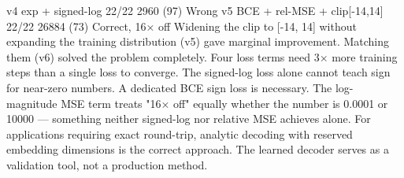 {}\markdownRendererPipe{} v4 \markdownRendererPipe{} exp + signed-log \markdownRendererPipe{} 22/22 \markdownRendererPipe{} 2960 (97\markdownRendererPercentSign{}) \markdownRendererPipe{} Wrong \markdownRendererPipe{}\markdownRendererSoftLineBreak
{}\markdownRendererPipe{} v5 \markdownRendererPipe{} BCE + rel-MSE + clip[-14,14] \markdownRendererPipe{} 22/22 \markdownRendererPipe{} 26884 (73\markdownRendererPercentSign{}) \markdownRendererPipe{} Correct, 16× off \markdownRendererPipe{}\markdownRendererSoftLineBreak
{}\markdownRendererPipe{}  \markdownRendererPipe{}  \markdownRendererPipe{}  \markdownRendererPipe{}  \markdownRendererPipe{}  \markdownRendererPipe{}\markdownRendererInterblockSeparator
{}
\markdownRendererSectionEnd \markdownRendererSectionBegin
{}\markdownRendererInterblockSeparator
{}\markdownRendererOlBeginTight
{} Widening the clip to [-14, 14] without expanding the training distribution (v5) gave marginal improvement. Matching them (v6) solved the problem completely.\markdownRendererOlItemEnd 
{} Four loss terms need 3× more training steps than a single loss to converge.\markdownRendererOlItemEnd 
{} The signed-log loss alone cannot teach sign for near-zero numbers. A dedicated BCE sign loss is necessary.\markdownRendererOlItemEnd 
{} The log-magnitude MSE term treats "16× off" equally whether the number is 0.0001 or 10000 — something neither signed-log nor relative MSE achieves alone.\markdownRendererOlItemEnd 
{} For applications requiring exact round-trip, analytic decoding with reserved embedding dimensions is the correct approach. The learned decoder serves as a validation tool, not a production method.\markdownRendererOlItemEnd 
